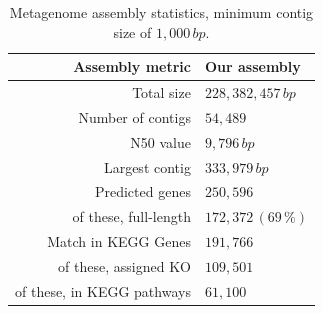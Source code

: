 \documentclass{bmcart}
\begin{document}
\begin{backmatter}
\begin{table}[h!]
\caption{Metagenome assembly statistics, minimum contig size of $1,000\,bp$.}
\begin{tabular}{rl}
\hline
Assembly metric & Our assembly\\
\hline
Total size & $228,382,457\,bp$\\
Number of contigs & $54,489$\\
N50 value & $9,796\,bp$\\
Largest contig & $333,979\,bp$\\
\hline
Predicted genes & $250,596$\\
of these, full-length & $172,372\,(69\,\%)$\\
Match in KEGG Genes & $191,766$\\
of these, assigned KO & $109,501$\\
of these, in KEGG pathways & $61,100$\\
\hline
\end{tabular}
\label{tAssembly}
\end{table}


%


\end{backmatter}
\end{document}
